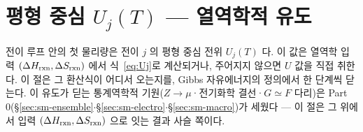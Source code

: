 \section{평형 중심 $U_j(T)$ --- 열역학적 유도}\label{sec:center}
전이 루프 안의 첫 물리량은 전이 $j$ 의 평형 중심 전위 $U_j(T)$ 다. 이 값은 열역학 입력 $(\Delta H_{\mathrm{rxn}},\Delta S_{\mathrm{rxn}})$
에서 식~\eqref{eq:Uj}로 계산되거나, 주어지지 않으면 $U$ 값을 직접 취한다. 이 절은 그 환산식이 어디서 오는지를, Gibbs
자유에너지의 정의에서 한 단계씩 닫는다. 이 유도가 딛는 통계역학적 기원($Z\to\mu$·전기화학 결선·$G\simeq F$ 다리)은
Part 0(\S\ref{sec:sm-ensemble}$\cdot$\S\ref{sec:sm-electro}$\cdot$\S\ref{sec:sm-macro})가 세웠다 --- 이 절은 그 위에서 입력
$(\Delta H_{\mathrm{rxn}},\Delta S_{\mathrm{rxn}})$ 으로 잇는 결과 사슬 쪽이다.

